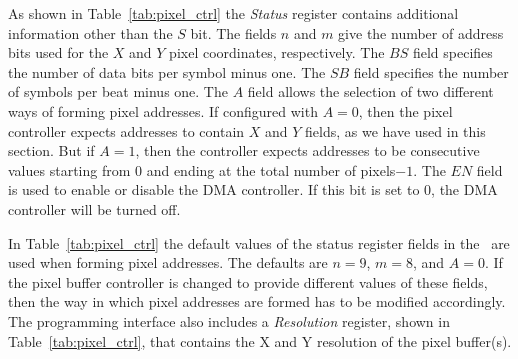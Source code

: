 As shown in Table~\ref{tab:pixel_ctrl} the {\it Status} register contains additional information
other than the $S$ bit. The fields $n$ and $m$ give the number of address bits used for
the $X$ and $Y$ pixel coordinates, respectively. The $BS$ field specifies the number of
data bits per symbol minus one. The $SB$ field specifies the number of symbols per beat minus one. The $A$ field allows 
the selection of two different ways of forming pixel addresses. If configured with $A=0$, then 
the pixel controller expects addresses to contain $X$ and $Y$ fields, as we have used in this
section. But if $A=1$, then the controller expects addresses to be consecutive
values starting from 0 and ending at the total number of pixels$ - 1$. The $EN$ field is used to enable or disable the DMA controller. If this bit is set to 0, the DMA controller will be turned off.

In Table~\ref{tab:pixel_ctrl} the default values of the status register fields in the \systemName~are used when forming pixel addresses. The defaults are $n=9$,  $m=8$,
and $A = 0$. If the pixel buffer controller is changed to provide different values of
these fields, then the way in which pixel addresses are formed has to be modified accordingly. 
The programming interface also includes a {\it Resolution} register, shown 
in Table~\ref{tab:pixel_ctrl}, that contains the X and Y resolution of the pixel buffer(s).  
